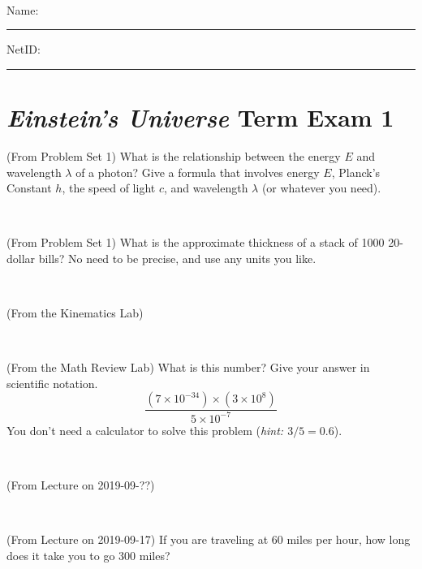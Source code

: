 \documentclass[12pt, letterpaper]{article}
\begin{document}
\vfill ~


\cleardoublepage



\noindent
Name: \rule[-1ex]{0.60\textwidth}{0.1pt}
NetID: \rule[-1ex]{0.20\textwidth}{0.1pt}

\section*{\textsl{Einstein's Universe} Term Exam 1}
\setcounter{problem}{1}


\begin{problem} (From Problem Set 1)
What is the relationship between the energy $E$ and wavelength
$\lambda$ of a photon? Give a formula that involves energy $E$,
Planck's Constant $h$, the speed of light $c$, and wavelength
$\lambda$ (or whatever you need).
\end{problem}

\vfill ~

\begin{problem} (From Problem Set 1)
What is the approximate thickness of a stack of 1000 20-dollar bills?
No need to be precise, and use any units you like.
\end{problem}


\vfill ~

\begin{problem} (From the Kinematics Lab)

\end{problem}


\vfill ~

\begin{problem} (From the Math Review Lab)
What is this number? Give your answer in scientific notation.
$$
\frac{(7\times10^{-34})\times(3\times10^8)}{5\times10^{-7}}
$$
You don't need a calculator to solve this problem (\textit{hint: $3/5=0.6$}).
\end{problem}


\vfill ~


\clearpage


\begin{problem} (From Lecture on 2019-09-??)
\end{problem}


\vfill ~

\begin{problem} (From Lecture on 2019-09-17)
If you are traveling at 60 miles per hour, how long does
it take you to go 300 miles?
\end{problem}
\end{document}
